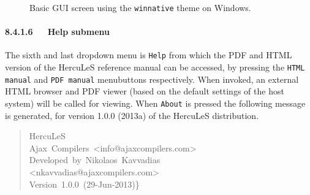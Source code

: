 \documentclass[a4paper]{article}
\begin{document}
\begin{figure}
\label{hercules-gui-basicscreen-winnative}
\noindent{}
\caption{Basic GUI screen using the \texttt{winnative} theme on Windows.}
\end{figure}


\paragraph{8.4.1.6~~~Help submenu%
  \label{help-submenu}%
}

The sixth and last dropdown menu is \texttt{Help} from which the PDF and HTML version of the HercuLeS reference manual can be accessed, by pressing the \texttt{HTML manual} and \texttt{PDF manual} menubuttons respectively. When invoked, an external HTML browser and PDF viewer (based on the default settings of the host system) will be called for viewing. When \texttt{About} is pressed the following message is generated, for version 1.0.0 (2013a) of the HercuLeS distribution.
%
\begin{quote}{\ttfamily \raggedright \noindent
HercuLeS\\
Ajax~Compilers~<info@ajaxcompilers.com>\\
Developed~by~Nikolaos~Kavvadias\\
<nkavvadias@ajaxcompilers.com>\\
Version~1.0.0~(29-Jun-2013)\}
}
\end{quote}
\end{document}
